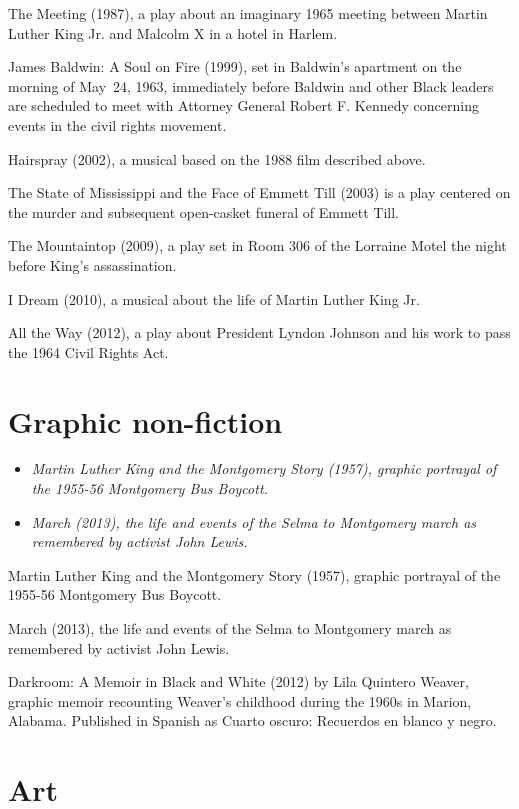 The Meeting (1987), a play about an imaginary 1965 meeting between
Martin Luther King Jr. and Malcolm X in a hotel in Harlem.

James Baldwin: A Soul on Fire (1999), set in Baldwin's apartment on the
morning of May~24, 1963, immediately before Baldwin and other Black
leaders are scheduled to meet with Attorney General Robert F. Kennedy
concerning events in the civil rights movement.

Hairspray (2002), a musical based on the 1988 film described above.

The State of Mississippi and the Face of Emmett Till (2003) is a play
centered on the murder and subsequent open-casket funeral of Emmett
Till.

The Mountaintop (2009), a play set in Room 306 of the Lorraine Motel the
night before King's assassination.

I Dream (2010), a musical about the life of Martin Luther King Jr.

All the Way (2012), a play about President Lyndon Johnson and his work
to pass the 1964 Civil Rights Act.

\section{Graphic non-fiction}\label{graphic-non-fiction}

\begin{itemize}
\item
  \emph{Martin Luther King and the Montgomery Story (1957), graphic
  portrayal of the 1955-56 Montgomery Bus Boycott.}
\item
  \emph{March (2013), the life and events of the Selma to Montgomery
  march as remembered by activist John Lewis.}
\end{itemize}

Martin Luther King and the Montgomery Story (1957), graphic portrayal of
the 1955-56 Montgomery Bus Boycott.

March (2013), the life and events of the Selma to Montgomery march as
remembered by activist John Lewis.

Darkroom: A Memoir in Black and White (2012) by Lila Quintero Weaver,
graphic memoir recounting Weaver's childhood during the 1960s in Marion,
Alabama. Published in Spanish as Cuarto oscuro: Recuerdos en blanco y
negro.

\section{Art}\label{art}

